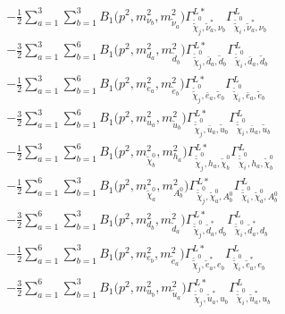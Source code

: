 \begin{itemize}
\begin{align}
 &-\frac{1}{2} \sum_{a=1}^{3}\sum_{b=1}^{3}{B_1\Big(p^{2},m^2_{\nu_{{b}}},m^2_{\tilde{\nu}_{{a}}}\Big)} {\Gamma^{L*}_{\check{\tilde{\chi}}^0_{{j}},\tilde{\nu}^*_{{a}},\nu_{{b}}}} {\Gamma^L_{\check{\tilde{\chi}}^0_{{i}},\tilde{\nu}^*_{{a}},\nu_{{b}}}}  \nonumber \\ 
 &-\frac{3}{2} \sum_{a=1}^{3}\sum_{b=1}^{6}{B_1\Big(p^{2},m^2_{d_{{a}}},m^2_{\tilde{d}_{{b}}}\Big)} {\Gamma^{L*}_{\check{\tilde{\chi}}^0_{{j}},\bar{d}_{{a}},\tilde{d}_{{b}}}} {\Gamma^L_{\check{\tilde{\chi}}^0_{{i}},\bar{d}_{{a}},\tilde{d}_{{b}}}}  \nonumber \\ 
 &-\frac{1}{2} \sum_{a=1}^{3}\sum_{b=1}^{6}{B_1\Big(p^{2},m^2_{e_{{a}}},m^2_{\tilde{e}_{{b}}}\Big)} {\Gamma^{L*}_{\check{\tilde{\chi}}^0_{{j}},\bar{e}_{{a}},\tilde{e}_{{b}}}} {\Gamma^L_{\check{\tilde{\chi}}^0_{{i}},\bar{e}_{{a}},\tilde{e}_{{b}}}}  \nonumber \\ 
 &-\frac{3}{2} \sum_{a=1}^{3}\sum_{b=1}^{6}{B_1\Big(p^{2},m^2_{u_{{a}}},m^2_{\tilde{u}_{{b}}}\Big)} {\Gamma^{L*}_{\check{\tilde{\chi}}^0_{{j}},\bar{u}_{{a}},\tilde{u}_{{b}}}} {\Gamma^L_{\check{\tilde{\chi}}^0_{{i}},\bar{u}_{{a}},\tilde{u}_{{b}}}}  \nonumber \\ 
 &-\frac{1}{2} \sum_{a=1}^{3}\sum_{b=1}^{6}{B_1\Big(p^{2},m^2_{\tilde{\chi}^0_{{b}}},m^2_{h_{{a}}}\Big)} {\Gamma^{L*}_{\check{\tilde{\chi}}^0_{{j}},h_{{a}},\tilde{\chi}^0_{{b}}}} {\Gamma^L_{\check{\tilde{\chi}}^0_{{i}},h_{{a}},\tilde{\chi}^0_{{b}}}}  \nonumber \\ 
 &-\frac{1}{2} \sum_{a=1}^{6}\sum_{b=1}^{3}{B_1\Big(p^{2},m^2_{\tilde{\chi}^0_{{a}}},m^2_{A^0_{{b}}}\Big)} {\Gamma^{L*}_{\check{\tilde{\chi}}^0_{{j}},\tilde{\chi}^0_{{a}},A^0_{{b}}}} {\Gamma^L_{\check{\tilde{\chi}}^0_{{i}},\tilde{\chi}^0_{{a}},A^0_{{b}}}}  \nonumber \\ 
 &-\frac{3}{2} \sum_{a=1}^{6}\sum_{b=1}^{3}{B_1\Big(p^{2},m^2_{d_{{b}}},m^2_{\tilde{d}_{{a}}}\Big)} {\Gamma^{L*}_{\check{\tilde{\chi}}^0_{{j}},\tilde{d}^*_{{a}},d_{{b}}}} {\Gamma^L_{\check{\tilde{\chi}}^0_{{i}},\tilde{d}^*_{{a}},d_{{b}}}}  \nonumber \\ 
 &-\frac{1}{2} \sum_{a=1}^{6}\sum_{b=1}^{3}{B_1\Big(p^{2},m^2_{e_{{b}}},m^2_{\tilde{e}_{{a}}}\Big)} {\Gamma^{L*}_{\check{\tilde{\chi}}^0_{{j}},\tilde{e}^*_{{a}},e_{{b}}}} {\Gamma^L_{\check{\tilde{\chi}}^0_{{i}},\tilde{e}^*_{{a}},e_{{b}}}}  \nonumber \\ 
 &-\frac{3}{2} \sum_{a=1}^{6}\sum_{b=1}^{3}{B_1\Big(p^{2},m^2_{u_{{b}}},m^2_{\tilde{u}_{{a}}}\Big)} {\Gamma^{L*}_{\check{\tilde{\chi}}^0_{{j}},\tilde{u}^*_{{a}},u_{{b}}}} {\Gamma^L_{\check{\tilde{\chi}}^0_{{i}},\tilde{u}^*_{{a}},u_{{b}}}}  \nonumber \\ 

\end{align}
\end{itemize}
